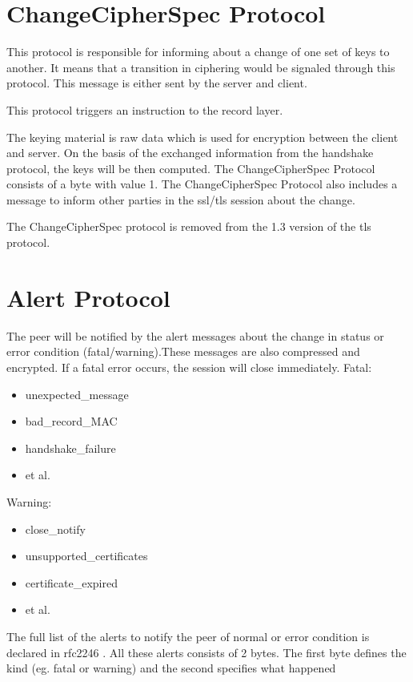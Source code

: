 \section{ChangeCipherSpec Protocol}
\label{sec:changeciphfer_protocol}
This protocol is responsible for informing about a change of one set of keys to another. It means that a transition in ciphering would be signaled through this protocol. This message is either sent by the server and client. 

This protocol triggers an instruction to the record layer.

The keying material is raw data which is used for encryption between the client and server. On the basis of the exchanged information from the handshake protocol, the keys will be then computed.
The ChangeCipherSpec Protocol consists of a byte with value 1.
The ChangeCipherSpec Protocol also includes a message to inform other parties in the \gls{ssl}/\gls{tls} session about the change.   \cite{ms:overview}

The ChangeCipherSpec protocol is removed from the 1.3 version of the \gls{tls} protocol.
\cite{WikipediaCipher}
\section{Alert Protocol}
\label{sec:alert_protocol}
The peer will be notified by the alert messages about the change in status or error condition (fatal/warning).These messages are also compressed and encrypted. If a fatal error occurs, the session will close immediately.
Fatal:
\begin{itemize}
	\item unexpected\_message
	 \item bad\_record\_MAC
	 \item handshake\_failure 
	 \item et al.
\end{itemize}
	
Warning:
\begin{itemize}
\item close\_notify
\item unsupported\_certificates
\item certificate\_expired
\item et al.

\end{itemize}

The full list of the alerts to notify the peer of normal or error condition is declared in \gls{rfc}2246 \cite{rfc2246}. All these alerts consists of 2 bytes. The first byte defines the kind (eg. fatal or warning) and the second specifies what happened \cite{W.Stalling} \cite{ms:overview}

